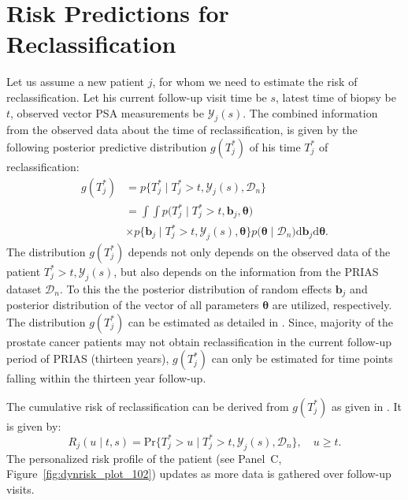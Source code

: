 \section{Risk Predictions for Reclassification}
\label{sec:param_estimates_jm_fit_prias}
Let us assume a new patient $j$, for whom we need to estimate the risk of reclassification. Let his current follow-up visit time be $s$, latest time of biopsy be $t$, observed vector PSA measurements be $\mathcal{Y}_{j}(s)$. The combined information from the observed data about the time of reclassification, is given by the following posterior predictive distribution $g(T^*_j)$ of his time $T^*_j$ of reclassification:
\begin{equation*}
\label{eq:post_pred_dist}
\begin{aligned}
g(T^*_j) &= p\big\{T^*_j \mid T^*_j > t, \mathcal{Y}_{j}(s), \mathcal{D}_n\big\}\\
&= \int \int p\big(T^*_j \mid T^*_j > t, \boldsymbol{b}_j, \boldsymbol{\theta}\big)\\
&\times p\big\{\boldsymbol{b}_j \mid T^*_j>t, \mathcal{Y}_{j}(s), \boldsymbol{\theta}\big\}p\big(\boldsymbol{\theta} \mid \mathcal{D}_n\big) \mathrm{d} \boldsymbol{b}_j \mathrm{d} \boldsymbol{\theta}.
\end{aligned}
\end{equation*}
The distribution $g(T^*_j)$ depends not only depends on the observed data of the patient $T^*_j > t, \mathcal{Y}_{j}(s)$, but also depends on the information from the PRIAS dataset $\mathcal{D}_n$. To this the the posterior distribution of random effects $\boldsymbol{b}_j$ and posterior distribution of the vector of all parameters $\boldsymbol{\theta}$ are utilized, respectively. The distribution $g(T^*_j)$ can be estimated as detailed in \citet{rizopoulos2017dynamic}. Since, majority of the prostate cancer patients may not obtain reclassification in the current follow-up period of PRIAS (thirteen years), $g(T^*_j)$ can only be estimated for time points falling within the thirteen year follow-up. 

The cumulative risk of reclassification can be derived from $g(T^*_j)$ as given in \citep{rizopoulos2017dynamic}. It is given by:
\begin{equation}
\label{eq:dynamic_risk_prob}
R_j(u \mid t,s) = \mbox{Pr}\big\{T^*_j > u \mid T^*_j > t, \mathcal{Y}_{j}(s), \mathcal{D}_n\big\}, \quad u \geq t.
\end{equation}
The personalized risk profile of the patient (see Panel~C, Figure~\ref{fig:dynrisk_plot_102}) updates as more data is gathered over follow-up visits. 

